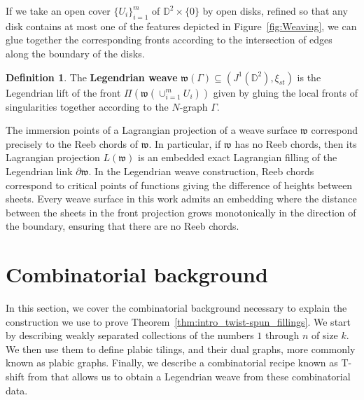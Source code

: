 \documentclass[11pt]{amsart}
\newcommand{\w}{\mathfrak{w}}
\newcommand{\D}{\mathbb{D}}
\theoremstyle{plain}
\theoremstyle{definition}
\newtheorem{definition}[theorem]{Definition}
\begin{document}
	If we take an open cover $\{U_i\}_{i=1}^m$ of $\D^2\times \{0\}$ by open disks, refined so that any disk contains at most one of the features depicted in Figure~\ref{fig:Weaving}, we can glue together the corresponding fronts according to the intersection of edges along the boundary of the disks. 

	
	\begin{definition}\label{def: weave}
	    The \textbf{Legendrian weave} $\w(\Gamma)\subseteq (J^1(\D^2), \xi_{st})$ is the Legendrian lift of the front $\Pi(\w(\cup_{i=1}^m U_i))$ given by gluing the local fronts of singularities together according to the $N$-graph $\Gamma$.
	\end{definition}




 
 
	
	The immersion points of a  Lagrangian projection of a weave surface $\w$ correspond precisely to the Reeb chords of $\w$. In particular, if $\w$ has no Reeb chords, then its Lagrangian projection $L(\w)$ is an embedded exact Lagrangian filling of the Legendrian link $\partial\w$. In the Legendrian weave construction, Reeb chords correspond to critical points of functions giving the difference of heights between sheets. Every weave surface in this work admits an embedding where the distance between the sheets in the front projection grows monotonically in the direction of the boundary, ensuring that there are no Reeb chords. 
















\section{Combinatorial background}\label{sec: combinatorics_background}
In this section, we cover the combinatorial background necessary to explain the construction we use to prove Theorem~\ref{thm:intro_twist-spun_fillings}. We start by describing weakly separated collections of the numbers $1$ through $n$ of size $k$. We then use them to define plabic tilings, and their dual graphs, more commonly known as plabic graphs. Finally, we describe a combinatorial recipe known as T-shift from \cite{CLSW2023} that allows us to obtain a Legendrian weave from these combinatorial data. 
\end{document}
